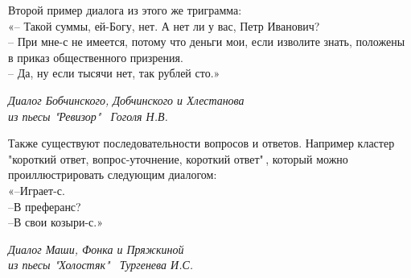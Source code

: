 \documentclass[a4paper,14pt]{article}
\begin{document}
\begin{justify}
Второй пример диалога из этого же триграмма: \\
\indent
«-- Такой суммы, ей-Богу, нет. А нет ли у вас, Петр Иванович? \\
\indent
-- При мне-с не имеется, потому что деньги мои, если изволите знать, положены в приказ общественного призрения. \\
\indent
-- Да, ну если тысячи нет, так рублей сто.»
\begin{flushright}\textit{Диалог Бобчинского, Добчинского и Хлестанова\\из пьесы "Ревизор" \ Гоголя Н.В.}\end{flushright}
\indent
Также существуют последовательности вопросов и ответов. Например кластер "короткий ответ, вопрос-уточнение, короткий ответ"\,, который можно проиллюстрировать следующим диалогом: \\
\indent
«--Играет-с. \\
\indent
--В преферанс? \\
\indent
--В свои козыри-с.»
\begin{flushright}\textit{Диалог Маши, Фонка и Пряжкиной\\из пьесы "Холостяк" \ Тургенева И.С.}\end{flushright}



\end{justify}
\end{document}

